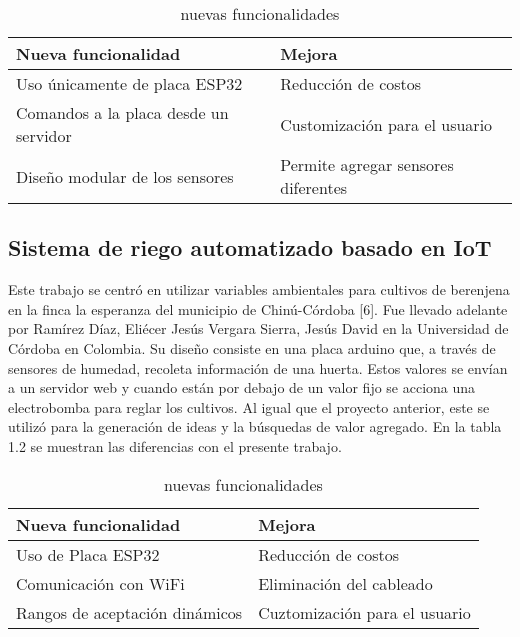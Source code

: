 \begin{table}[h]
	\centering
	\caption[Nuevas funcionalidades sobre el proyecto de Cadavid y Garcia]{nuevas funcionalidades}
	\begin{tabular}{l l}    
		\toprule
		\textbf{Nueva funcionalidad} & \textbf{Mejora}\\	
		\midrule
		Uso únicamente de placa ESP32           & Reducción de costos	\\		
		Comandos a la placa desde un servidor          & Customización para el usuario\\	
		Diseño modular de los sensores          & Permite agregar sensores diferentes\\	
		\bottomrule
		\hline
	\end{tabular}
	\label{tab:peces}
\end{table}

\subsection{Sistema de riego automatizado basado en IoT}
Este trabajo se centró en utilizar variables ambientales para cultivos de berenjena en la finca la esperanza del municipio de Chinú-Córdoba [6]. Fue llevado adelante por Ramírez Díaz, Eliécer Jesús Vergara Sierra, Jesús David en la Universidad de Córdoba en Colombia. 
Su diseño consiste en una placa arduino que, a través de sensores de humedad, recoleta información de una huerta. Estos valores se envían a un servidor web y cuando están por debajo de un valor fijo se acciona una electrobomba para reglar los cultivos. Al igual que el proyecto anterior, este se utilizó para la generación de ideas y la búsquedas de valor agregado. En la tabla 1.2 se muestran las diferencias con el presente trabajo.\\

\begin{table}[h]
	\centering
	\caption[Nuevas funcionalidades sobre el proyecto de Díaz, Sierra y David]{nuevas funcionalidades}
	\begin{tabular}{l l}    
		\toprule
		\textbf{Nueva funcionalidad} & \textbf{Mejora}\\	
		\midrule
		Uso de Placa ESP32           & Reducción de costos	\\		
		Comunicación con WiFi          & Eliminación del cableado\\	
		Rangos de aceptación dinámicos          & Cuztomización para el usuario\\		
		\bottomrule
		\hline
	\end{tabular}
	\label{tab:peces}\\
\end{table}

